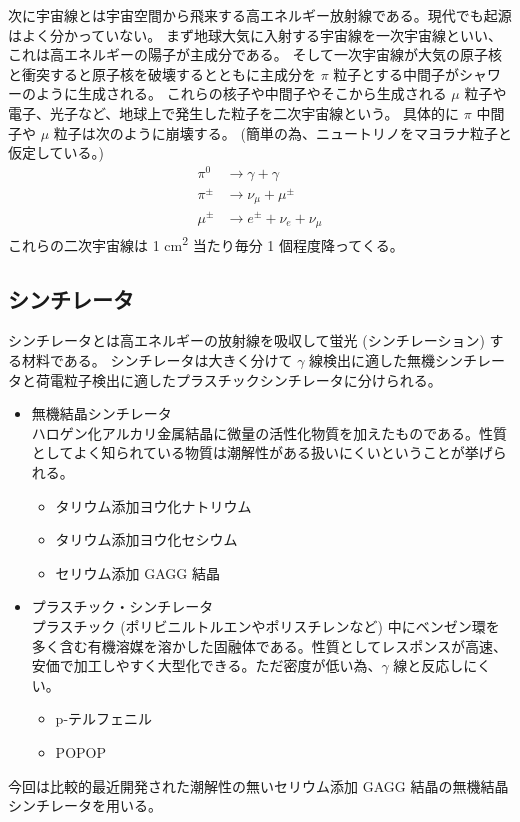 \documentclass[uplatex,dvipdfmx,a4paper,11pt]{jlreq}
\numberwithin{equation}{section}
\theoremstyle{definition}
\begin{document}
次に宇宙線とは宇宙空間から飛来する高エネルギー放射線である。現代でも起源はよく分かっていない。
まず地球大気に入射する宇宙線を一次宇宙線といい、これは高エネルギーの陽子が主成分である。
そして一次宇宙線が大気の原子核と衝突すると原子核を破壊するとともに主成分を $\pi$ 粒子とする中間子がシャワーのように生成される。
これらの核子や中間子やそこから生成される $\mu$ 粒子や電子、光子など、地球上で発生した粒子を二次宇宙線という。
具体的に $\pi$ 中間子や $\mu$ 粒子は次のように崩壊する。 (簡単の為、ニュートリノをマヨラナ粒子と仮定している。)
\begin{align}
  \pi^0   & \to \gamma + \gamma         \\
  \pi^\pm & \to \nu_\mu + \mu^\pm       \\
  \mu^\pm & \to e^\pm + \nu_e + \nu_\mu
\end{align}
これらの二次宇宙線は 1 \si{cm^2} 当たり毎分 1 個程度降ってくる。

\subsection{シンチレータ}
シンチレータとは高エネルギーの放射線を吸収して蛍光 (シンチレーション) する材料である。
シンチレータは大きく分けて $\gamma$ 線検出に適した無機シンチレータと荷電粒子検出に適したプラスチックシンチレータに分けられる。
\begin{itemize}
  \item 無機結晶シンチレータ \\
        ハロゲン化アルカリ金属結晶に微量の活性化物質を加えたものである。性質としてよく知られている物質は潮解性がある扱いにくいということが挙げられる。
        \begin{itemize}
          \item タリウム添加ヨウ化ナトリウム 
          \item タリウム添加ヨウ化セシウム 
          \item セリウム添加 GAGG 結晶 
        \end{itemize}
  \item プラスチック・シンチレータ \\
        プラスチック (ポリビニルトルエンやポリスチレンなど) 中にベンゼン環を多く含む有機溶媒を溶かした固融体である。性質としてレスポンスが高速、安価で加工しやすく大型化できる。ただ密度が低い為、$\gamma$ 線と反応しにくい。
        \begin{itemize}
          \item p-テルフェニル
          \item POPOP
        \end{itemize}
\end{itemize}
今回は比較的最近開発された潮解性の無いセリウム添加 GAGG 結晶の無機結晶シンチレータを用いる。
\end{document}
